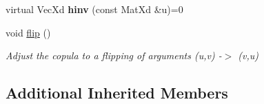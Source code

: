 \begin{DoxyCompactItemize}
\item 
\hypertarget{class_archimedean_bicop_ad9f6cd9ae6ca06f0d2edea2a52f195c9}{virtual Vec\+Xd {\bfseries hinv} (const Mat\+Xd \&u)=0}\label{class_archimedean_bicop_ad9f6cd9ae6ca06f0d2edea2a52f195c9}

\item 
\hypertarget{class_archimedean_bicop_afc56334b1c34406b5148386d9b7e5f43}{void \hyperlink{class_archimedean_bicop_afc56334b1c34406b5148386d9b7e5f43}{flip} ()}\label{class_archimedean_bicop_afc56334b1c34406b5148386d9b7e5f43}

\begin{DoxyCompactList}\small\item\em Adjust the copula to a flipping of arguments (u,v) -\/$>$ (v,u) \end{DoxyCompactList}\end{DoxyCompactItemize}
\subsection*{Additional Inherited Members}
